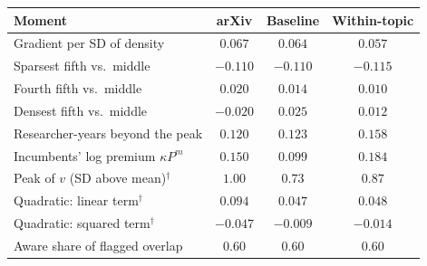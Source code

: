 \begin{tabular}{@{}lccc@{}}
\toprule
Moment & arXiv & Baseline & Within-topic \\
\midrule
Gradient per SD of density & $0.067$ & $0.064$ & $0.057$ \\
Sparsest fifth vs.\ middle & $-0.110$ & $-0.110$ & $-0.115$ \\
Fourth fifth vs.\ middle & $0.020$ & $0.014$ & $0.010$ \\
Densest fifth vs.\ middle & $-0.020$ & $0.025$ & $0.012$ \\
Researcher-years beyond the peak & $0.120$ & $0.123$ & $0.158$ \\
Incumbents' log premium $\kappa P^m$ & $0.150$ & $0.099$ & $0.184$ \\
Peak of $v$ (SD above mean)$^\dagger$ & $1.00$ & $0.73$ & $0.87$ \\
Quadratic: linear term$^\dagger$ & $0.094$ & $0.047$ & $0.048$ \\
Quadratic: squared term$^\dagger$ & $-0.047$ & $-0.009$ & $-0.014$ \\
Aware share of flagged overlap & $0.60$ & $0.60$ & $0.60$ \\
\bottomrule
\end{tabular}

